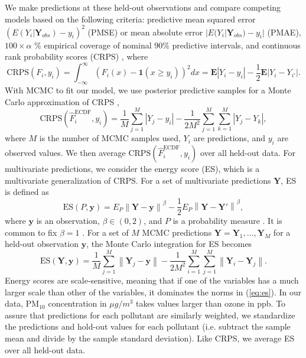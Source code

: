 \documentclass[alpha-refs]{wiley-article}
\newcommand{\bone}{\textbf{1}}
\newcommand{\bE}{\textbf{E}}
\newcommand{\by}{\textbf{y}}
\newcommand{\bY}{\textbf{Y}}
\begin{document}
We make predictions at these held-out observations and compare competing models based on the following criteria: predictive mean squared error $(E(Y_i|\bY_{obs}) - y_i)^2$ (PMSE) or mean absolute error $|E(Y_i|\bY_{obs}) - y_i|$ (PMAE), $100\times \alpha$ \%  empirical coverage of nominal $90\%$ predictive intervals, and continuous rank probability scores (CRPS) \citep{gneiting2007}, where
\begin{equation}
\text{CRPS}(F_i,y_i) = \int^\infty_{-\infty} (F_i(x) -  \bone(x \geq y_i) )^2 dx = \bE|Y_i - y_i | - \frac{1}{2}\bE | Y_i - Y_{i'} | .
\end{equation}
With MCMC to fit our model, we use posterior predictive samples for a Monte Carlo approximation of CRPS \citep[see, e.g., ][]{kruger2016},
\begin{equation}
\text{CRPS}(\hat{F}^\text{ECDF}_i,y_i) = \frac{1}{M} \sum_{j=1}^M |Y_j - y_i| - \frac{1}{2M^2} \sum_{j=1}^M \sum_{k=1}^M | Y_j - Y_k| ,
\end{equation}
where $M$ is the number of MCMC samples used, $Y_i$ are predictions, and $y_i$ are observed values. We then average $\text{CRPS}(\hat{F}^\text{ECDF}_i,y_i)$ over all held-out data. 
For multivariate predictions, we consider the energy score (ES), which is a multivariate generalization of CRPS. For a set of multivariate predictions $\bY$, ES is defined as
\begin{equation}
\text{ES}(P,\by) =  E_P \left\| \bY - \by \right\|^\beta - \frac{1}{2} E_P \left\| \bY - \bY' \right\|^\beta,
\end{equation}
where $\by$ is an observation, $\beta \in (0,2)$, and $P$ is a probability measure \citep{gneiting2007}. It is common to fix $\beta = 1$ \citep[see, e.g.,][]{gneiting2008,jordan2017}. For a set of $M$ MCMC predictions $ \bY = \bY_1,...,\bY_M$ for a held-out observation $\by$, the Monte Carlo integration for ES becomes
\begin{equation}\label{eq:es}
\text{ES}(\bY,\by) = \frac{1}{M} \sum^M_{j=1} \left\| \bY_j - \by \right\|  - \frac{1}{2M^2} \sum^M_{i=1} \sum^M_{j=1} \left\| \bY_i - \bY_j \right\|.
\end{equation}
Energy scores are scale-sensitive, meaning that if one of the variables has a much larger scale than other of the variables, it dominates the norms in (\ref{eq:es}). In our data, $\text{PM}_{10}$ concentration in $\mu g/m^3$ takes values larger than ozone in ppb. To assure that predictions for each pollutant are similarly weighted, we standardize the predictions and hold-out values for each pollutant (i.e. subtract the sample mean and divide by the sample standard deviation). Like CRPS, we average ES over all held-out data.
\end{document}
